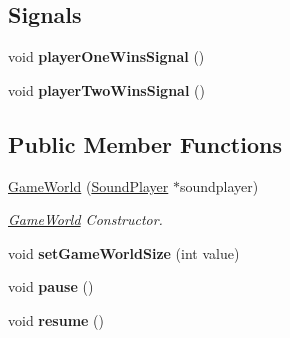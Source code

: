 \subsection*{Signals}
\begin{DoxyCompactItemize}
\item 
void {\bfseries player\+One\+Wins\+Signal} ()\hypertarget{class_game_world_a0fbfa50d5f60312808f9e274e0f920d5}{}\label{class_game_world_a0fbfa50d5f60312808f9e274e0f920d5}

\item 
void {\bfseries player\+Two\+Wins\+Signal} ()\hypertarget{class_game_world_a7b4e0c5e973e19449250249036c98b58}{}\label{class_game_world_a7b4e0c5e973e19449250249036c98b58}

\end{DoxyCompactItemize}
\subsection*{Public Member Functions}
\begin{DoxyCompactItemize}
\item 
\hyperlink{class_game_world_a4917d80cbe417b0dc1d9023499d83f72}{Game\+World} (\hyperlink{class_sound_player}{Sound\+Player} $\ast$soundplayer)\hypertarget{class_game_world_a4917d80cbe417b0dc1d9023499d83f72}{}\label{class_game_world_a4917d80cbe417b0dc1d9023499d83f72}

\begin{DoxyCompactList}\small\item\em \hyperlink{class_game_world}{Game\+World} Constructor. \end{DoxyCompactList}\item 
void {\bfseries set\+Game\+World\+Size} (int value)\hypertarget{class_game_world_a2a8abffdaba4eee013e9b9d90e33a1ab}{}\label{class_game_world_a2a8abffdaba4eee013e9b9d90e33a1ab}

\item 
void {\bfseries pause} ()\hypertarget{class_game_world_a16bb1b2b833157573cb2a5e7de7a9ea8}{}\label{class_game_world_a16bb1b2b833157573cb2a5e7de7a9ea8}

\item 
void {\bfseries resume} ()\hypertarget{class_game_world_abac3f51224b0a62f23312534d3c642e5}{}\label{class_game_world_abac3f51224b0a62f23312534d3c642e5}

\end{DoxyCompactItemize}
